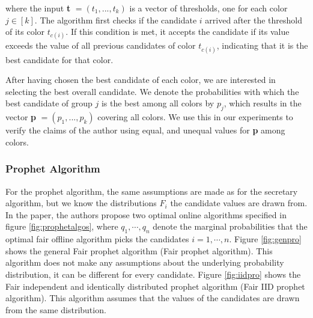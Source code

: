 where the input \textbf{t} $= (t_1, ..., t_k)$ is a vector of thresholds, one for each color $j \in [k]$. The algorithm first checks if the candidate $i$ arrived after the threshold of its color $t_{c(i)}$. If this condition is met, it accepts the candidate if its value exceeds the value of all previous candidates of color $t_{c(i)}$, indicating that it is the best candidate for that color.

After having chosen the best candidate of each color, we are interested in selecting the best overall candidate. We denote the probabilities with which the best candidate of group $j$ is the best among all colors by $p_j$, which results in the vector \textbf{p} $= (p_1,...,p_k)$ covering all colors. We use this in our experiments to verify the claims of the author using equal, and unequal values for \textbf{p} among colors.

\subsubsection{Prophet Algorithm}
For the prophet algorithm, the same assumptions are made as for the secretary algorithm, but we know the distributions $F_i$ the candidate values are drawn from. In the paper, the authors propose two optimal online algorithms specified in figure \ref{fig:prophetalgos}, where $q_1, \cdots, q_n$ denote the marginal probabilities that the optimal fair offline algorithm picks the candidates $i=1, \cdots, n$. Figure \ref{fig:genpro} shows the general Fair prophet algorithm (Fair prophet algorithm). This algorithm does not make any assumptions about the underlying probability distribution, it can be different for every candidate. Figure \ref{fig:iidpro} shows the Fair independent and identically distributed prophet algorithm (Fair IID prophet algorithm). This algorithm assumes that the values of the candidates are drawn from the same distribution.

